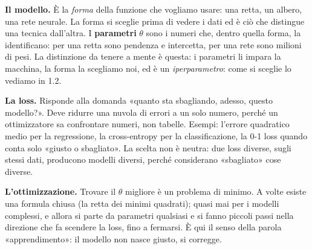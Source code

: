 \documentclass[12pt]{extarticle}
\begin{document}
\noindent\textbf{Il modello.} È la \emph{forma} della funzione che vogliamo usare: una retta, un albero, una rete neurale. La forma si sceglie prima di vedere i dati ed è ciò che distingue una tecnica dall'altra. I \textbf{parametri} $\theta$ sono i numeri che, dentro quella forma, la identificano: per una retta sono pendenza e intercetta, per una rete sono milioni di pesi. La distinzione da tenere a mente è questa: i parametri li impara la macchina, la forma la scegliamo noi, ed è un \emph{iperparametro}: come si sceglie lo vediamo in 1.2.

\noindent\textbf{La loss.} Risponde alla domanda «quanto sta sbagliando, adesso, questo modello?». Deve ridurre una nuvola di errori a un solo numero, perché un ottimizzatore sa confrontare numeri, non tabelle. Esempi: l'errore quadratico medio per la regressione, la cross-entropy per la classificazione, la 0-1 loss quando conta solo «giusto o sbagliato». La scelta non è neutra: due loss diverse, sugli stessi dati, producono modelli diversi, perché considerano «sbagliato» cose diverse.

\noindent\textbf{L'ottimizzazione.} Trovare il $\theta$ migliore è un problema di minimo. A volte esiste una formula chiusa (la retta dei minimi quadrati); quasi mai per i modelli complessi, e allora si parte da parametri qualsiasi e si fanno piccoli passi nella direzione che fa scendere la loss, fino a fermarsi. È qui il senso della parola «apprendimento»: il modello non nasce giusto, si corregge.
\end{document}
